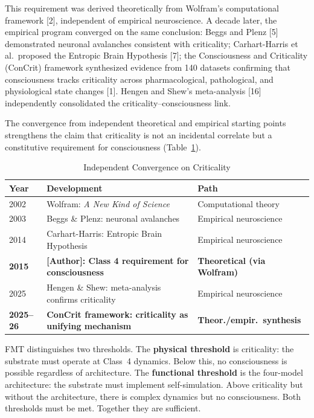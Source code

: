 \documentclass[11pt]{article}
\begin{document}
This requirement was derived theoretically from Wolfram's computational framework [2], independent of empirical neuroscience. A decade later, the empirical program converged on the same conclusion: Beggs and Plenz [5] demonstrated neuronal avalanches consistent with criticality; Carhart-Harris et al.\ proposed the Entropic Brain Hypothesis [7]; the Consciousness and Criticality (ConCrit) framework synthesized evidence from 140 datasets confirming that consciousness tracks criticality across pharmacological, pathological, and physiological state changes [1]. Hengen and Shew's meta-analysis [16] independently consolidated the criticality--consciousness link.

The convergence from independent theoretical and empirical starting points strengthens the claim that criticality is not an incidental correlate but a constitutive requirement for consciousness (Table~\ref{tab:convergence}).

\begin{table}[h]
\centering
\caption{Independent Convergence on Criticality}
\label{tab:convergence}
\begin{tabularx}{\textwidth}{@{}lXl@{}}
\toprule
\textbf{Year} & \textbf{Development} & \textbf{Path} \\
\midrule
2002 & Wolfram: \emph{A New Kind of Science} & Computational theory \\
2003 & Beggs \& Plenz: neuronal avalanches & Empirical neuroscience \\
2014 & Carhart-Harris: Entropic Brain Hypothesis & Empirical neuroscience \\
\textbf{2015} & \textbf{[Author]: Class 4 requirement for consciousness} & \textbf{Theoretical (via Wolfram)} \\
2025 & Hengen \& Shew: meta-analysis confirms criticality & Empirical neuroscience \\
\textbf{2025--26} & \textbf{ConCrit framework: criticality as unifying mechanism} & \textbf{Theor./empir.\ synthesis} \\
\bottomrule
\end{tabularx}
\end{table}

FMT distinguishes two thresholds. The \textbf{physical threshold} is criticality: the substrate must operate at Class~4 dynamics. Below this, no consciousness is possible regardless of architecture. The \textbf{functional threshold} is the four-model architecture: the substrate must implement self-simulation. Above criticality but without the architecture, there is complex dynamics but no consciousness. Both thresholds must be met. Together they are sufficient.
\end{document}
